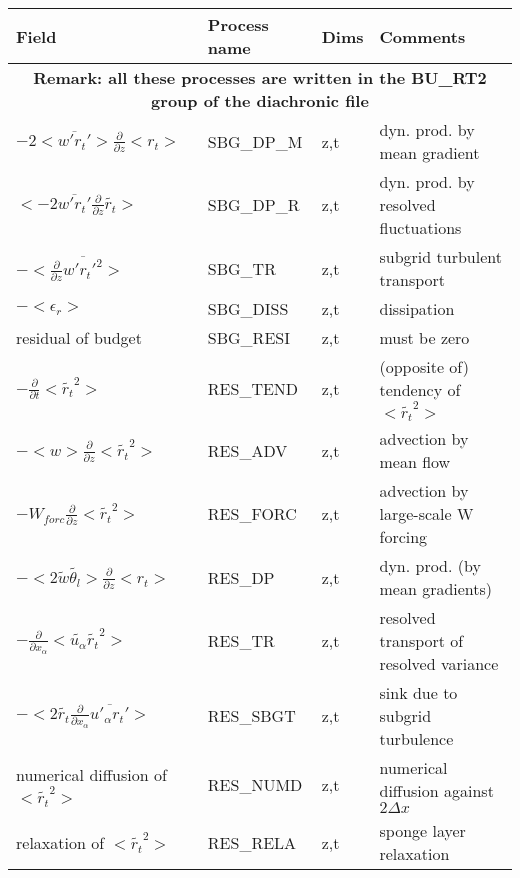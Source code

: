 \begingroup
\renewcommand\arraystretch{1.5}
\begin{longtable}[c]{|p{}|p{}|p{}|p{}|}
\hline
Field & Process name & Dims & Comments \\
\hline \hline
\endhead
\multicolumn{4}{|c|}{\textbf{Remark: all these processes are written in the BU\_RT2 group of the diachronic file}} \\
\hline
\endfoot
$- 2 <\overline{w'r_t'}>\frac{\partial }{\partial z}<r_t>$             & SBG\_DP\_M & z,t & dyn. prod. by mean gradient \\\hline
$<-2 \overline{w'r_t'}\frac{\partial}{\partial z}\tilde{r_t}>$         & SBG\_DP\_R & z,t & dyn. prod. by resolved fluctuations\\\hline
$-<\frac{\partial}{\partial z}\overline{w'r_t'^2}>$                    & SBG\_TR    & z,t & subgrid turbulent transport\\\hline
$-<\epsilon_r>$                                                        & SBG\_DISS  & z,t & dissipation \\\hline
{\rm residual of budget}                                               & SBG\_RESI  & z,t & must be zero \\\hline
$-\frac{\partial }{\partial t}<\tilde{r_t}^2>$                         & RES\_TEND  & z,t & (opposite of) tendency of $<\tilde{r_t}^2>$\\\hline
$-<w>\frac{\partial}{\partial z}<\tilde{r_t}^2>$                       & RES\_ADV   & z,t & advection by mean flow\\\hline
$-W_{forc}\frac{\partial}{\partial z}<\tilde{r_t}^2>$                  & RES\_FORC  & z,t & advection by large-scale W forcing\\\hline
$-< 2 \tilde{w}\tilde{\theta_l}>\frac{\partial }{\partial z}<r_t>$     & RES\_DP    & z,t & dyn. prod. (by mean gradients) \\\hline
$-\frac{\partial}{\partial x_\alpha} <\tilde{u_\alpha} \tilde{r_t}^2>$ & RES\_TR    & z,t & resolved transport of resolved variance \\\hline
$- <2 \tilde{r_t}\frac{\partial}{\partial x_\alpha}\overline{u'_\alpha r_t'}>$ & RES\_SBGT & z,t & sink due to subgrid turbulence \\\hline
{\rm numerical diffusion of } $<\tilde{r_t}^2>$                        & RES\_NUMD  & z,t & numerical diffusion against $2\Delta x$ \\\hline
{\rm relaxation of }$<\tilde{r_t}^2>$                                  & RES\_RELA  & z,t & sponge layer relaxation \\\hline

\end{longtable}
